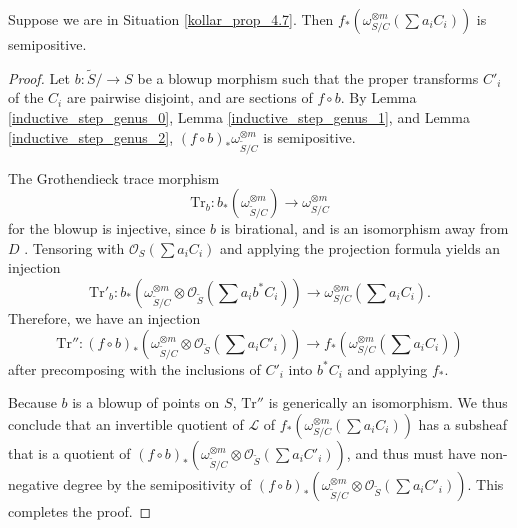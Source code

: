 \begin{lemma}
Suppose we are in Situation \ref{kollar_prop_4.7}.
Then $f_{*}\left(\omega_{S/C}^{\otimes m}\left(\sum a_iC_i\right)\right)$ is semipositive.
\end{lemma}
\begin{proof}
Let $b:\widetilde{S}/\to S$ be a blowup morphism such that the proper transforms $C'_i$ of the $C_i$ are pairwise disjoint, and are sections of $f\circ b$.
By Lemma \ref{inductive_step_genus_0}, Lemma \ref{inductive_step_genus_1}, and Lemma \ref{inductive_step_genus_2}, $(f\circ b)_{*}\omega_{\widetilde{S}/C}^{\otimes m}$ is semipositive.

The Grothendieck trace morphism
$$
\mathrm{Tr}_b : b_*(\omega_{\widetilde{S}/C}^{\otimes m})
\longrightarrow \omega_{S/C}^{\otimes m}
$$
for the blowup is injective, since $b$ is birational, and is an isomorphism away
from $D$ \cite[Prop.\ 5.77]{KM}. Tensoring with $\mathcal{O}_{S}\left(\sum a_iC_i\right)$ and applying the projection formula yields an injection
$$
\mathrm{Tr}'_b : b_*\left(\omega_{\widetilde{S}/C}^{\otimes m}\otimes\mathcal{O}_{\widetilde{S}}\left(\sum a_ib^{*}C_i\right)\right)
\longrightarrow \omega_{S/C}^{\otimes m}\left(\sum a_iC_i\right).
$$
Therefore, we have an injection
$$
\mathrm{Tr}'':(f\circ b)_{*}\left(\omega_{\widetilde{S}/C}^{\otimes m}\otimes\mathcal{O}_{\widetilde{S}}\left(\sum a_iC'_i\right)\right)
\longrightarrow f_{*}\left(\omega_{S/C}^{\otimes m}\left(\sum a_iC_i\right)\right)
$$
after precomposing with the inclusions of $C'_i$ into $b^*C_i$ and applying $f_*$. 

Because $b$ is a blowup of points on $S$, $\mathrm{Tr}''$ is generically an isomorphism. 
We thus conclude that an invertible quotient of $\mathcal{L}$ of $f_{*}\left(\omega_{S/C}^{\otimes m}\left(\sum a_iC_i\right)\right)$ has a subsheaf that is a quotient of $(f\circ b)_{*}\left(\omega_{\widetilde{S}/C}^{\otimes m}\otimes\mathcal{O}_{\widetilde{S}}\left(\sum a_iC'_i\right)\right)$, and thus must have non-negative degree by the semipositivity of $(f\circ b)_{*}\left(\omega_{\widetilde{S}/C}^{\otimes m}\otimes\mathcal{O}_{\widetilde{S}}\left(\sum a_iC'_i\right)\right)$.
This completes the proof.
\end{proof}

